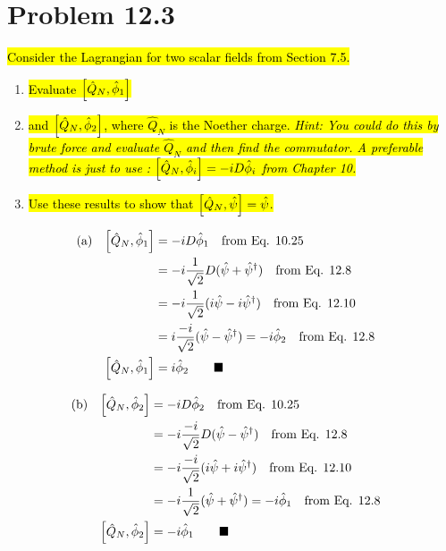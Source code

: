\documentclass{article}
\begin{document}
\section*{Problem 12.3}
\begin{quoting}
    \hl{Consider the Lagrangian for two scalar fields from Section 7.5.}
    \begin{enumerate}[label=(\alph*)]
        \item \hl{Evaluate $\bqty{\hat{Q}_N,\hat{\phi}_1}$}
        \item \hl{and $\bqty{\hat{Q}_N,\hat{\phi}_2}$, where $\hat{Q}_N$ is the Noether charge. \emph{Hint: You could do this by brute force and evaluate $\hat{Q}_N$ and then find the commutator. A preferable method is just to use : $\bqty{\hat{Q}_N,\hat{\phi}_i}=-iD\hat{\phi}_i$ from Chapter 10.}}
        \item \hl{Use these results to show that $\bqty{\hat{Q}_N,\hat{\psi}}=\hat{\psi}$.}
    \end{enumerate}
\end{quoting}


\begin{align*}
    \qq*{(a)}\bqty{\hat{Q}_N,\hat{\phi}_1} & =-iD\hat{\phi}_1\qq{from Eq. 10.25}                                                   \\
                                           & =-i\frac{1}{\sqrt{2}}D(\hat{\psi}+\hat{\psi}^\dagger)\qq{from Eq. 12.8}               \\
                                           & =-i\frac{1}{\sqrt{2}}(i\hat{\psi}-i\hat{\psi}^\dagger)\qq{from Eq. 12.10}             \\
                                           & =i\frac{-i}{\sqrt{2}}(\hat{\psi}-\hat{\psi}^\dagger)=-i\hat{\phi}_2\qq{from Eq. 12.8} \\
    \bqty{\hat{Q}_N,\hat{\phi}_1}          & =i\hat{\phi}_2\qquad\blacksquare                                                      \\
\end{align*}

\begin{align*}
    \qq*{(b)}\bqty{\hat{Q}_N,\hat{\phi}_2} & =-iD\hat{\phi}_2\qq{from Eq. 10.25}                                                   \\
                                           & =-i\frac{-i}{\sqrt{2}}D(\hat{\psi}-\hat{\psi}^\dagger)\qq{from Eq. 12.8}              \\
                                           & =-i\frac{-i}{\sqrt{2}}(i\hat{\psi}+i\hat{\psi}^\dagger)\qq{from Eq. 12.10}            \\
                                           & =-i\frac{1}{\sqrt{2}}(\hat{\psi}+\hat{\psi}^\dagger)=-i\hat{\phi}_1\qq{from Eq. 12.8} \\
    \bqty{\hat{Q}_N,\hat{\phi}_2}          & =-i\hat{\phi}_1\qquad\blacksquare                                                     \\
\end{align*}
\end{document}
